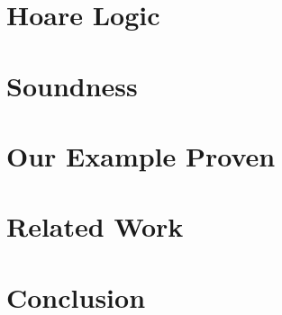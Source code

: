 \documentclass[acmsmall,review,anonymous,screen]{acmart}\settopmatter{printfolios=true,printacmref=false}
\begin{document}

\section{Hoare Logic} %
\label{sect:proofSystem}
 
 
 
 \section{Soundness} %
 \label{sect:sound:proofSystem}


  \section{Our Example Proven} %
 \label{sect:example:proof:short}


 \section{Related Work}
 \label{sect:related}
 

\section{Conclusion}
\label{sect:conclusion}
  





%
% 
%
% 

  




\clearpage
\end{document}
